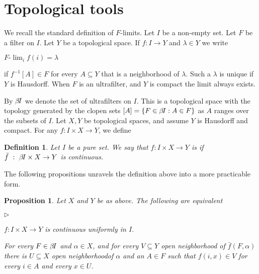 \documentclass[12pt,letterpaper,oneside,reqno]{amsart}
\newcommand{\mylabel}[1]{{#1}\hfill}
\renewenvironment{itemize}
  {\begin{list}{$\triangleright$}{%
   \setlength{\parskip}{0mm}
   \setlength{\topsep}{.2\baselineskip}
   \setlength{\rightmargin}{0mm}
   \setlength{\listparindent}{0mm}
   \setlength{\itemindent}{0mm}
   \setlength{\labelwidth}{3ex}
   \setlength{\itemsep}{.2\baselineskip}
   \setlength{\parsep}{.2\baselineskip}
   \setlength{\partopsep}{0mm}
   \setlength{\labelsep}{1ex}
   \setlength{\leftmargin}{\labelwidth+\labelsep}
   \let\makelabel\mylabel}}{%
   \end{list}}
\theoremstyle{plain}
\newtheorem{proposition}[theorem]{Proposition}
\newtheorem{definition}[theorem]{Definition}
\theoremstyle{remark}
\renewcommand*{\emph}[1]{%
   \smash{\tikz[baseline]\node[rectangle, fill=olive!25, rounded corners, inner xsep=0.5ex, inner ysep=0.2ex, anchor=base, minimum height = 2.7ex]{#1};}}
\begin{document}
\section{Topological tools}\label{topology}

We recall the standard definition of $F$-limits.
Let $I$ be a non-empty set.
Let $F$ be a filter on $I$.
Let $Y$ be a topological space.
If $f:I\to Y$ and $\lambda\in Y$ we write

\hfil$\displaystyle F\mbox{-}\lim_{i}f(i)=\lambda$

if $f^{-1}[A]\in F$ for every $A\subseteq Y$ that is a neighborhood of $\lambda$.
Such a $\lambda$ is unique if $Y$ is Hausdorff.
When $F$ is an ultrafilter, and $Y$ is compact the limit always exists.

By $\beta\kern-1.5pt I$ we denote the set of ultrafilters on $I$. This is a topological space with the topology generated by the clopen sets $[A]=\{F\in\beta\kern-1.5pt I: A\in F\}$ as $A$ ranges over the subsets of $I$.
Let $X,Y$ be topological spaces, and assume $Y$ is Hausdorff and compact.
For any $f:I\times X\to Y$, we define
  



\begin{definition}\label{def_unif_cont}
  Let $I$ be a pure set.   
  We say that $f:I\times X\to Y$ is \emph{continuous uniformly in $I$} if  $\bar f\ :\ \beta\kern-1.5pt I\times X\to Y$ is continuous.
\end{definition}

The following propositions unravels the definition above into a more practicable form.

\begin{proposition}\label{prop_uc_esplicito}
  Let $X$ and $Y$ be as above.
  The following are equivalent
  \begin{itemize}
    \item[1.] $f:I\times X\to Y$ is continuous uniformly in $I$.
    \item[2.] For every $F\in\beta\kern-1.5pt I$ and $\alpha\in X$, and for every $V\subseteq Y$ open neighborhood of $\bar f(F,\alpha)$ there is $U\subseteq X$ open neighborhoodof $\alpha$ and an $A\in F$ such that $f(i,x)\in V$ for every $i\in A$ and every $x\in U$.
  \end{itemize}
\end{proposition}
\end{document}
